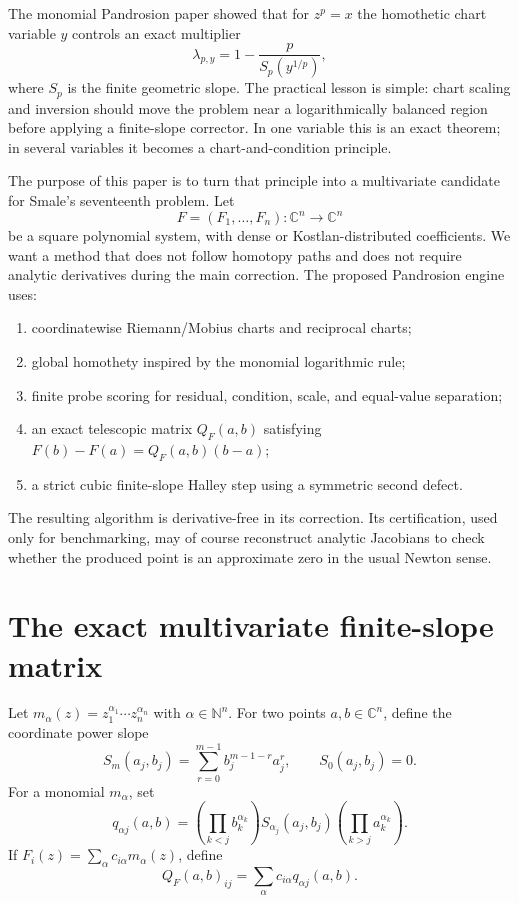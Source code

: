 \documentclass[11pt]{article}
\newcommand{\C}{\mathbb C}
\newcommand{\N}{\mathbb N}
\begin{document}
The monomial Pandrosion paper showed that for $z^p=x$ the homothetic chart variable $y$ controls an exact multiplier
\[
        \lambda_{p,y}=1-\frac{p}{S_p(y^{1/p})},
\]
where $S_p$ is the finite geometric slope.  The practical lesson is simple: chart scaling and inversion should move the problem near a logarithmically balanced region before applying a finite-slope corrector.  In one variable this is an exact theorem; in several variables it becomes a chart-and-condition principle.

The purpose of this paper is to turn that principle into a multivariate candidate for Smale's seventeenth problem.  Let
\[
        F=(F_1,\ldots,F_n):\C^n\to\C^n
\]
be a square polynomial system, with dense or Kostlan-distributed coefficients.  We want a method that does not follow homotopy paths and does not require analytic derivatives during the main correction.  The proposed Pandrosion engine uses:
\begin{enumerate}[label=(\roman*)]
\item coordinatewise Riemann/Mobius charts and reciprocal charts;
\item global homothety inspired by the monomial logarithmic rule;
\item finite probe scoring for residual, condition, scale, and equal-value separation;
\item an exact telescopic matrix $Q_F(a,b)$ satisfying $F(b)-F(a)=Q_F(a,b)(b-a)$;
\item a strict cubic finite-slope Halley step using a symmetric second defect.
\end{enumerate}

The resulting algorithm is derivative-free in its correction.  Its certification, used only for benchmarking, may of course reconstruct analytic Jacobians to check whether the produced point is an approximate zero in the usual Newton sense.

\section{The exact multivariate finite-slope matrix}

Let $m_\alpha(z)=z_1^{\alpha_1}\cdots z_n^{\alpha_n}$ with $\alpha\in\N^n$.  For two points $a,b\in\C^n$, define the coordinate power slope
\[
        S_m(a_j,b_j)=\sum_{r=0}^{m-1} b_j^{m-1-r}a_j^r,
        \qquad S_0(a_j,b_j)=0.
\]
For a monomial $m_\alpha$, set
\[
        q_{\alpha j}(a,b)=
        \left(\prod_{k<j} b_k^{\alpha_k}\right)
        S_{\alpha_j}(a_j,b_j)
        \left(\prod_{k>j} a_k^{\alpha_k}\right).
\]
If $F_i(z)=\sum_\alpha c_{i\alpha}m_\alpha(z)$, define
\[
        Q_F(a,b)_{ij}=\sum_\alpha c_{i\alpha}q_{\alpha j}(a,b).
\]
\end{document}
